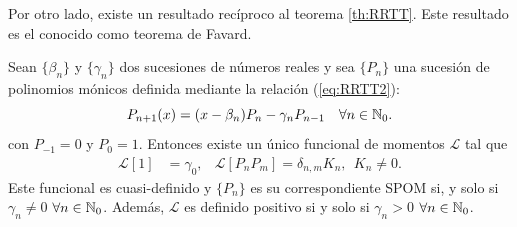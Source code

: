 Por otro lado, existe un resultado recíproco al teorema \ref{th:RRTT}. Este resultado es el conocido como teorema de Favard.

\begin{teorema}[Favard]
    \label{th:favard}
    Sean $\{\beta_n\}$ y $\{\gamma_n\}$ dos sucesiones de números reales  y sea $\{P_n\}$ una sucesión de polinomios mónicos definida mediante la relación (\ref{eq:RRTT2}):
    $$
    P_{n+1}(x) = (x-\beta_n) P_n - \gamma_n P_{n-1} \ \ \ \forall n\in\N_0.
    $$
    con $P_{-1}=0$ y $P_0=1$. Entonces existe un único funcional de momentos $\mathcal L$ tal que 
    \begin{align*}
        \mathcal{L}[1]&=\gamma_0, & \mathcal L[P_n P_m]=\delta_{n,m}K_n, \ \ K_n\not=0.
    \end{align*}
    Este funcional es cuasi-definido y $\{P_n\}$ es su correspondiente SPOM si, y solo si $\gamma_n\neq 0$ $\forall n\in \mathbb{N}_0$. Además, $\mathcal{L}$ es definido positivo si y solo si $\gamma_n >0$ $\forall n\in \mathbb{N}_0$. 
\end{teorema}
